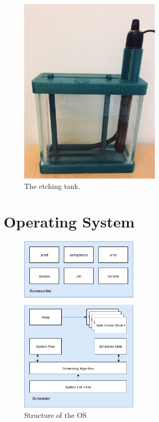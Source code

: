 \begin{figure}[H]
\centering  
\includegraphics[width=0.6\textwidth]{./fig/tank}   
\caption[The etching tank.]{The etching tank.}   
\label{fig:tank} 
\end{figure}

\section{Operating System}
\label{sec:os}

\begin{figure}[H]                                                         
\centering          
\includegraphics[width=0.5\textwidth]{./fig/redhead_os}   
\caption[Structure of the \gls{OS}]{Structure of the \gls{OS}}   
\label{fig:redhead_os}                                                       
\end{figure}  

